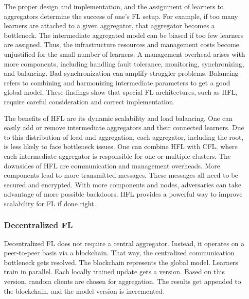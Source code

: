 The proper design and implementation, and the assignment of learners to aggregators determine the success of one's FL setup.
For example, if too many learners are attached to a given aggregator, that aggregator becomes a bottleneck.
The intermediate aggregated model can be biased if too few learners are assigned.
Thus, the infrastructure resources and management costs become unjustified for the small number of learners.
A management overhead arises with more components, including handling fault tolerance, monitoring, synchronizing, and balancing.
Bad synchronization can amplify straggler problems.
Balancing refers to combining and harmonizing intermediate parameters to get a good global model.
These findings show that special FL architectures, such as HFL, require careful consideration and correct implementation.
\cite{book:fl,paper:decentralized_edge_intelligence_dynamic_resource_allocation_framework_hfl,hpfl_over_massive_mobile_edge_computing_networks}

The benefits of HFL are its dynamic scalability and load balancing.
One can easily add or remove intermediate aggregators and their connected learners.
Due to this distribution of load and aggregation, each aggregator, including the root, is less likely to face bottleneck issues.
One can combine HFL with CFL, where each intermediate aggregator is responsible for one or multiple clusters.
The downsides of HFL are communication and management overheads.
More components lead to more transmitted messages.
These messages all need to be secured and encrypted.
With more components and nodes, adversaries can take advantage of more possible backdoors.
HFL provides a powerful way to improve scalability for FL if done right.
\cite{
    paper:deploying_fl_in_hierarchical_edge_architecture,
    paper:hfl_with_momentum_acceleration_in_multi_tier_networks,
    paper:hfl_with_privacy,
    paper:decentralized_edge_intelligence_dynamic_resource_allocation_framework_hfl,
    book:fl,
    hpfl_over_massive_mobile_edge_computing_networks}


\subsubsection{Decentralized FL}
Decentralized FL does not require a central aggregator.
Instead, it operates on a peer-to-peer basis via a blockchain.
That way, the centralized communication bottleneck gets resolved.
The blockchain represents the global model.
Learners train in parallel.
Each locally trained update gets a version.
Based on this version, random clients are chosen for aggregation.
The results get appended to the blockchain, and the model version is incremented. \cite{book:fl}

